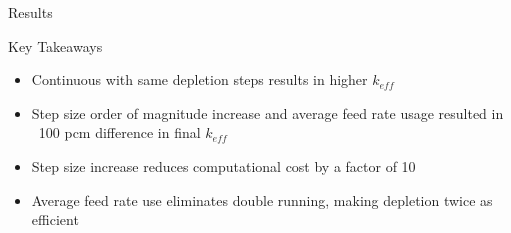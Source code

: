 \documentclass[final]{beamer}
\newlength{\onecolwid}
\newlength{\threecolwid}
\begin{document}
\begin{frame}[t]
\begin{columns}[t,totalwidth=\threecolwid]
\begin{column}{\onecolwid}
\begin{block}{Results}
\begin{alertblock}{Key Takeaways}
\begin{itemize}
	\item Continuous with same depletion steps results in higher $k_{eff}$
	\item Step size order of magnitude increase and average feed rate usage resulted in ~100 pcm difference in final $k_{eff}$
	\item Step size increase reduces computational cost by a factor of 10
	\item Average feed rate use eliminates double running, making depletion twice as efficient
\end{itemize}
\end{alertblock}

\end{block}



%

%




\end{column}
\end{columns}
\end{frame}
\end{document}

